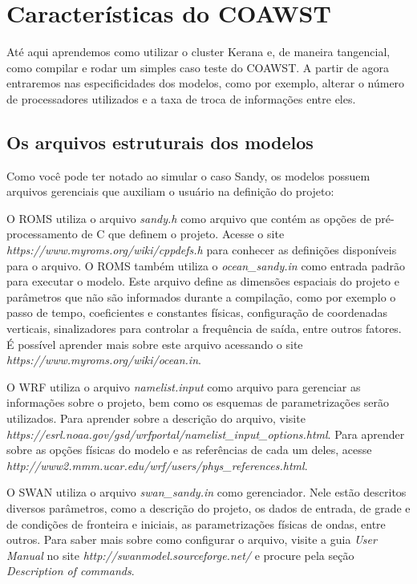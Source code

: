 \chapter{Características do COAWST}

\noindent Até aqui aprendemos como utilizar o cluster Kerana e, de maneira tangencial, como compilar e rodar um simples caso teste do COAWST. A partir de agora entraremos nas especificidades dos modelos, como por exemplo, alterar o número de processadores utilizados e a taxa de troca de informações entre eles.
\bigskip

\section{Os arquivos estruturais dos modelos}
\bigskip

\noindent Como você pode ter notado ao simular o caso Sandy, os modelos possuem arquivos gerenciais que auxiliam o usuário na definição do projeto:
\bigskip

\noindent O ROMS utiliza o arquivo \textit{sandy.h} como arquivo que contém as opções de pré-processamento de C que definem o projeto. Acesse o site \textcolor{bleu_cite}{\textit{https://www.myroms.org/wiki/cppdefs.h}} para conhecer as definições disponíveis para o arquivo. O ROMS também utiliza o \textit{ocean\_sandy.in} como entrada padrão para executar o modelo. Este arquivo define as dimensões espaciais do projeto e parâmetros que não são informados durante a compilação, como por exemplo o passo de tempo, coeficientes e constantes físicas, configuração de coordenadas verticais, sinalizadores para controlar a frequência de saída, entre outros fatores. É possível aprender mais sobre este arquivo acessando o site \textcolor{bleu_cite}{\textit{https://www.myroms.org/wiki/ocean.in}}.
\bigskip

\noindent O WRF utiliza o arquivo \textit{namelist.input} como arquivo para gerenciar as informações sobre o projeto, bem como os esquemas de parametrizações serão utilizados. Para aprender sobre a descrição do arquivo, visite \textcolor{bleu_cite}{\textit{https://esrl.noaa.gov/gsd/wrfportal/namelist\_input\_options.html}}. Para aprender sobre as opções físicas do modelo e as referências de cada um deles, acesse  \textcolor{bleu_cite}{\textit{http://www2.mmm.ucar.edu/wrf/users/phys\_references.html}}.
\bigskip

\noindent O SWAN utiliza o arquivo \textit{swan\_sandy.in} como gerenciador. Nele estão descritos diversos parâmetros, como a descrição do projeto, os dados de entrada, de grade e de condições de fronteira e iniciais, as parametrizações físicas de ondas, entre outros. Para saber mais sobre como configurar o arquivo, visite a guia \textit{User Manual} no site \textcolor{bleu_cite}{\textit{http://swanmodel.sourceforge.net/}} e procure pela seção \textit{Description of commands}.
\bigskip


